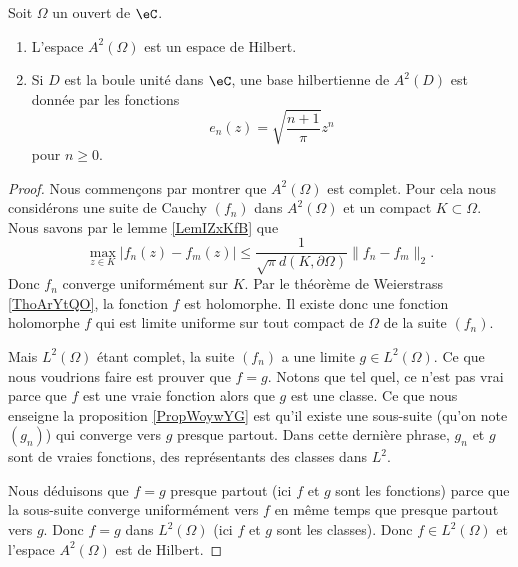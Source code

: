 \begin{theorem}
    Soit \( \Omega\) un ouvert de \( \eC\).
    \begin{enumerate}
        \item
            L'espace \( A^2(\Omega)\) est un espace de Hilbert.
        \item
            Si \( D\) est la boule unité dans \( \eC\), une base hilbertienne de \( A^2(D)\) est donnée par les fonctions
            \begin{equation}
                e_n(z)=\sqrt{\frac{ n+1 }{ \pi }}z^n
            \end{equation}
            pour \( n\geq 0\).
    \end{enumerate}
\end{theorem}

\begin{proof}
    Nous commençons par montrer que \( A^2(\Omega)\) est complet. Pour cela nous considérons une suite de Cauchy \( (f_n)\) dans \( A^2(\Omega)\) et un compact \( K\subset \Omega\). Nous savons par le lemme \ref{LemIZxKfB} que
    \begin{equation}
        \max_{z\in K}\big| f_n(z)-f_m(z) \big|\leq \frac{1}{ \sqrt{\pi}d(K,\partial\Omega) }\| f_n-f_m \|_2.
    \end{equation}
    Donc \( f_n\) converge uniformément sur \( K\). Par le théorème de Weierstrass \ref{ThoArYtQO}, la fonction \( f\) est holomorphe. Il existe donc une fonction holomorphe \( f\) qui est limite uniforme sur tout compact de \( \Omega\) de la suite \( (f_n)\).

    Mais \( L^2(\Omega)\) étant complet, la suite \( (f_n)\) a une limite \( g\in L^2(\Omega)\). Ce que nous voudrions faire est prouver que \( f=g\). Notons que tel quel, ce n'est pas vrai parce que \( f\) est une vraie fonction alors que \( g\) est une classe. Ce que nous enseigne la proposition \ref{PropWoywYG} est qu'il existe une sous-suite (qu'on note \( (g_n)\)) qui converge vers \( g\) presque partout. Dans cette dernière phrase, \( g_n\) et \( g\) sont de vraies fonctions, des représentants des classes dans \( L^2\).

    Nous déduisons que \( f=g\) presque partout (ici \( f\) et \( g\) sont les fonctions) parce que la sous-suite converge uniformément vers \( f\) en même temps que presque partout vers \( g\). Donc \( f=g\) dans \( L^2(\Omega)\) (ici \( f\) et \( g\) sont les classes). Donc \( f\in L^2(\Omega)\) et l'espace \( A^2(\Omega)\) est de Hilbert.


\end{proof}
